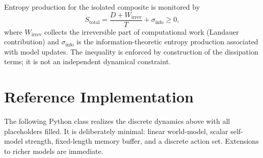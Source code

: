 \documentclass[11pt,a4paper]{article}
\begin{document}
Entropy production for the isolated composite is monitored by
\begin{equation}
  \dot S_{\mathrm{total}} = \frac{D + W_{\mathrm{irrev}}}{T} + \sigma_{\mathrm{info}} \ge 0,
\end{equation}
where \(W_{\mathrm{irrev}}\) collects the irreversible part of computational work (Landauer contribution) and \(\sigma_{\mathrm{info}}\) is the information-theoretic entropy production associated with model updates. The inequality is enforced by construction of the dissipation terms; it is not an independent dynamical constraint.

\section{Reference Implementation}

The following Python class realizes the discrete dynamics above with all placeholders filled. It is deliberately minimal: linear world-model, scalar self-model strength, fixed-length memory buffer, and a discrete action set. Extensions to richer models are immediate.
\end{document}
